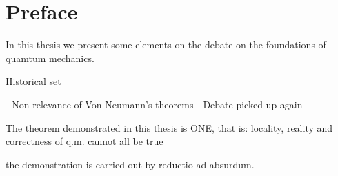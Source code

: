 \chapter*{Preface}

In this thesis we present some elements on the debate on the foundations of quamtum mechanics. 

Historical set


- Non relevance of Von Neumann's theorems
- Debate picked up again


The theorem demonstrated in this thesis is ONE, that is:
locality, reality and correctness of q.m. cannot all be true

the demonstration is carried out by reductio ad absurdum.

